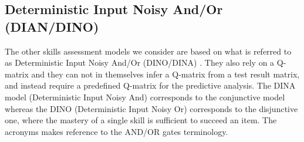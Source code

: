 



\subsection{Deterministic Input Noisy And/Or (DIAN/DINO)}
\label{DINA-DINO-Desc}
The other skills assessment models we consider are based on what is referred to as Deterministic Input Noisy And/Or (DINO/DINA) \cite{junker2001cognitive}.  They also rely on a Q-matrix and they can not in themselves infer a Q-matrix from a test result matrix, and instead require a predefined Q-matrix for the predictive analysis. The DINA model (Deterministic Input Noisy And) corresponds to the conjunctive model whereas the DINO (Deterministic Input Noisy Or) corresponds to the disjunctive one, where the mastery of a single skill is sufficient to succeed an item.  The acronyms makes reference to the AND/OR gates terminology.

